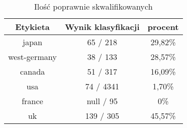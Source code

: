 \documentclass{classrep}
\begin{document}
\begin{table}[h]
\centering
\begin{tabular}{|c|c|c|}
\hline
Etykieta & Wynik klasyfikacji & procent\\
\hline
japan & 65 / 218 & 29,82\%\\
\hline
west-germany & 38 / 133 & 28,57\%\\
\hline
canada & 51 / 317 & 16,09\%\\
\hline
usa & 74 / 4341 & 1,70\%\\
\hline
france & null / 95 & 0\%\\
\hline
uk & 139 / 305 & 45,57\%\\
\hline
\end{tabular}
\caption{Ilość poprawnie skwalifikowanych}\end{table}
\end{document}
